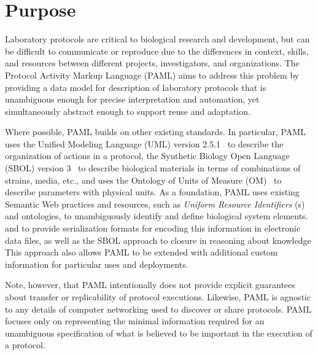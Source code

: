 \section{Purpose}

Laboratory protocols are critical to biological research and development, but can be difficult to communicate or reproduce due to the differences in context, skills, and resources between different projects, investigators, and organizations.
The Protocol Activity Markup Language (PAML) aims to address this problem by providing a data model for description of laboratory protocols that is unambiguous enough for precise interpretation and automation, yet simultaneously abstract enough to support reuse and adaptation.

Where possible, PAML builds on other existing standards.
In particular, PAML uses the Unified Modeling Language (UML) version 2.5.1~\citep{uml251} to describe the organization of actions in a protocol, the Synthetic Biology Open Language (SBOL) version 3~\citep{SBOL3} to describe biological materials in terms of combinations of strains, media, etc., and uses the Ontology of Units of Measure (OM)~\citep{om2} to describe parameters with physical units.
As a foundation, PAML uses existing Semantic Web practices and resources, such as \emph{Uniform Resource Identifiers} (s) and ontologies, to unambiguously identify and define biological system elements.
and to provide serialization formats for encoding this information in electronic data files, as well as the SBOL approach to closure in reasoning about knowledge
This approach also allows PAML to be extended with additional custom information for particular uses and deployments.

Note, however, that PAML intentionally does not provide explicit guarantees about transfer or replicability of protocol executions. 
Likewise, PAML is agnostic to any details of computer networking used to discover or share protocols.
PAML focuses only on representing the minimal information required for an unambiguous specification of what is believed to be important in the execution of a protocol.

